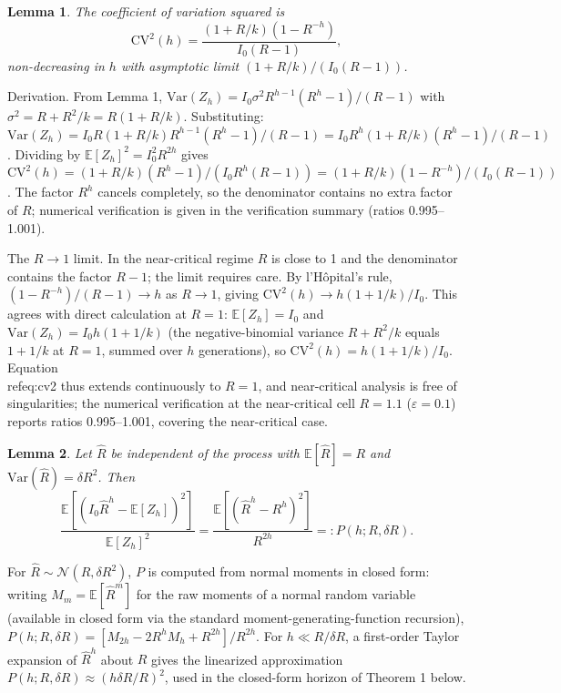 \documentclass[review]{elsarticle}
\theoremstyle{plain}
\newtheorem{lemma}{Lemma}
\theoremstyle{definition}
\begin{document}
\begin{lemma}
The coefficient of variation squared is
\begin{equation}
\text{CV}^2(h) = \frac{(1 + R/k)(1 - R^{-h})}{I_0 (R - 1)},
\label{eq:cv2}
\end{equation}
non-decreasing in $h$ with asymptotic limit $(1+R/k)/(I_0(R-1))$.
\end{lemma}

Derivation. From Lemma 1, $\text{Var}(Z_h) = I_0 \sigma^2 R^{h-1}(R^h - 1)/(R - 1)$ with $\sigma^2 = R + R^2/k = R(1 + R/k)$. Substituting: $\text{Var}(Z_h) = I_0 R(1+R/k) R^{h-1}(R^h-1)/(R-1) = I_0 R^h (1+R/k)(R^h-1)/(R-1)$. Dividing by $\mathbb{E}[Z_h]^2 = I_0^2 R^{2h}$ gives $\text{CV}^2(h) = (1+R/k)(R^h-1)/(I_0 R^h (R-1)) = (1+R/k)(1-R^{-h})/(I_0(R-1))$. The factor $R^h$ cancels completely, so the denominator contains no extra factor of $R$; numerical verification is given in the verification summary (ratios 0.995--1.001).

The $R \to 1$ limit. In the near-critical regime $R$ is close to 1 and the denominator contains the factor $R - 1$; the limit requires care. By l'H\^opital's rule, $(1 - R^{-h})/(R - 1) \to h$ as $R \to 1$, giving $\text{CV}^2(h) \to h(1 + 1/k)/I_0$. This agrees with direct calculation at $R = 1$: $\mathbb{E}[Z_h] = I_0$ and $\text{Var}(Z_h) = I_0 h(1 + 1/k)$ (the negative-binomial variance $R + R^2/k$ equals $1 + 1/k$ at $R = 1$, summed over $h$ generations), so $\text{CV}^2(h) = h(1+1/k)/I_0$. Equation~\\ref{eq:cv2} thus extends continuously to $R = 1$, and near-critical analysis is free of singularities; the numerical verification at the near-critical cell $R = 1.1$ ($\varepsilon = 0.1$) reports ratios 0.995--1.001, covering the near-critical case.

\begin{lemma}
Let $\hat{R}$ be independent of the process with $\mathbb{E}[\hat{R}] = R$ and $\text{Var}(\hat{R}) = \delta R^2$. Then
\begin{equation}
\frac{\mathbb{E}[(I_0 \hat{R}^h - \mathbb{E}[Z_h])^2]}{\mathbb{E}[Z_h]^2} = \frac{\mathbb{E}[(\hat{R}^h - R^h)^2]}{R^{2h}} =: P(h; R, \delta R).
\end{equation}
\end{lemma}
For $\hat{R} \sim \mathcal{N}(R, \delta R^2)$, $P$ is computed from normal moments in closed form: writing $M_m = \mathbb{E}[\hat{R}^m]$ for the raw moments of a normal random variable (available in closed form via the standard moment-generating-function recursion), $P(h;R,\delta R) = [M_{2h} - 2R^h M_h + R^{2h}]/R^{2h}$. For $h \ll R/\delta R$, a first-order Taylor expansion of $\hat{R}^h$ about $R$ gives the linearized approximation $P(h; R, \delta R) \approx (h\delta R/R)^2$, used in the closed-form horizon of Theorem 1 below.
\end{document}

